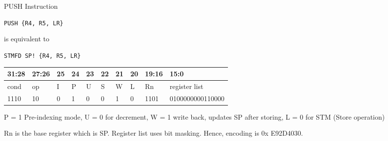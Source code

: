 \documentclass[aspectratio=169]{beamer}
\begin{document}
\begin{frame}
    \sectionpage
\end{frame}

\begin{frame}{PUSH Instruction}

        \begin{tcolorbox}[
            enhanced,
            colback=androidBlueLight,
            colframe=androidBlue,
            arc=5pt,
            boxrule=1pt,
            title=\textbf{},
            fonttitle=\bfseries,
            coltitle=black,
            top=10pt,
            bottom=8pt,
            left=8pt,
            right=8pt,
            attach boxed title to top left={xshift=10pt, yshift=-\tcboxedtitleheight/2},
            boxed title style={
                colback=androidBlue,    
                colframe=androidBlue,
                arc=3pt,
                boxrule=0pt,
                left=6pt, right=6pt,
                top=3pt, bottom=3pt
            }
            ]
            
            
            \texttt{PUSH \{R4, R5, LR\} }
    
            \vspace{0.5em}
    
            is equivalent to 
    
            \vspace{0.5em}
    
            \texttt{STMFD SP!  \{R4, R5, LR\} }
    
        \end{tcolorbox}

        \footnotesize
        \renewcommand{\arraystretch}{1.2}
        \begin{tabular}{|p{3.0em}|p{3.0em}|p{1.5em}|p{1.5em}|p{1.5em}|p{1.5em}|p{1.5em}|p{1.5em}|p{3.0em}|p{10.0em}|}
        \hline
        31:28 & 27:26 & 25 & 24 & 23 & 22 & 21 & 20 & 19:16 & 15:0\\
        \hline
        cond & op & I & P & U & S & W & L & Rn & register list\\
        \hline
        1110 & 10 & 0 & 1 & 0 & 0 & 1 & 0 & 1101 & 0100000000110000 \\
        \hline
        \end{tabular}

        \vspace{0.5em}
    

        P = 1 Pre-indexing mode, U = 0 for decrement, W = 1 write back, updates SP after storing, L = 0 for STM (Store operation)

        Rn is the base register which is SP. Register list uses bit masking. Hence, encoding is 0x E92D4030.

        
\end{frame}
\end{document}
